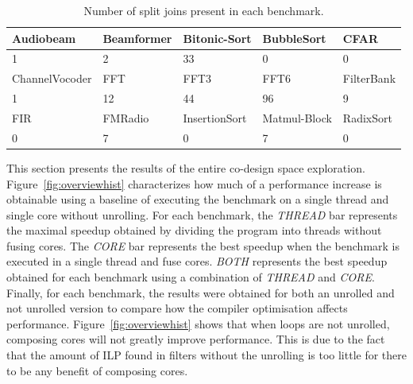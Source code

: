 \begin{table}[!htb]
  \small
 \begin{tabular} { | l | l | l | l | l | }
 \hline
   \cellcolor[gray]{0.7}Audiobeam&  \cellcolor[gray]{0.7} Beamformer& \cellcolor[gray]{0.7}Bitonic-Sort  &  \cellcolor[gray]{0.7} BubbleSort &  \cellcolor[gray]{0.7}  CFAR\\ \hline
  1 & 2 & 33 & 0 & 0 \\ \hline
   \cellcolor[gray]{0.7}ChannelVocoder &  \cellcolor[gray]{0.7} FFT&  \cellcolor[gray]{0.7}FFT3 &  \cellcolor[gray]{0.7} FFT6&  \cellcolor[gray]{0.7}FilterBank \\ \hline
  1 & 12 & 44 & 96 & 9 \\ \hline 
   \cellcolor[gray]{0.7}FIR &  \cellcolor[gray]{0.7} FMRadio &  \cellcolor[gray]{0.7} InsertionSort &  \cellcolor[gray]{0.7} Matmul-Block &  \cellcolor[gray]{0.7} RadixSort\\ \hline
  0 & 7 & 0 & 7 & 0 \\ \hline
 \end{tabular}
  \caption{Number of split joins present in each benchmark.}\label{tab:splitjoin}
\end{table}

This section  presents the results of the entire co-design space exploration.
Figure~\ref{fig:overviewhist} characterizes how much of a performance increase is obtainable using a baseline of executing the benchmark on a single thread and single core without unrolling.
For each benchmark, the \textit{THREAD} bar represents the maximal speedup obtained by dividing the program into threads without fusing cores.
The \textit{CORE} bar represents the best speedup when the benchmark is executed in a single thread and fuse cores.
\textit{BOTH} represents the best speedup obtained for each benchmark using a combination of \textit{THREAD} and \textit{CORE}.
Finally, for each benchmark, the results were obtained for both an unrolled and not unrolled version to compare how the compiler optimisation affects performance.
Figure~\ref{fig:overviewhist} shows that when loops are not unrolled, composing cores will not greatly improve performance.
This is due to the fact that the amount of ILP found in filters without the unrolling is too little for there to be any benefit of composing cores.

